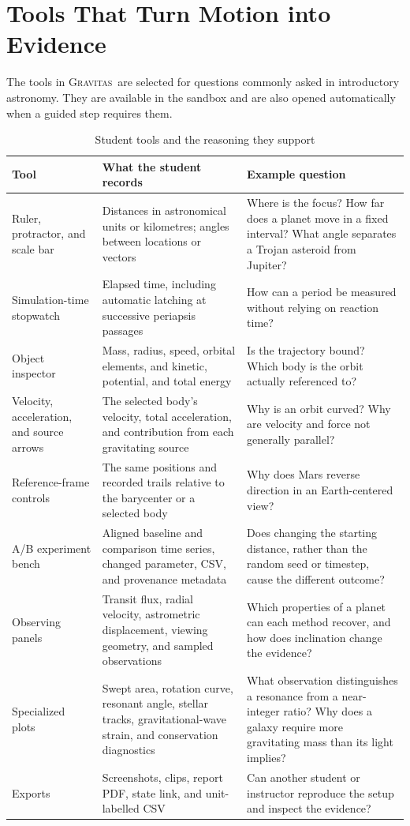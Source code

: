 \documentclass[twocolumn]{aastex631}
\newcommand{\Gravitas}{\textsc{Gravitas}}
\begin{document}
\section{Tools That Turn Motion into Evidence}
\label{sec:tools}

The tools in \Gravitas\ are selected for questions commonly asked in
introductory astronomy. They are available in the sandbox and are also opened
automatically when a guided step requires them.

\begin{table}[t]
\caption{Student tools and the reasoning they support}
\label{tab:tools}
\centering
\small
\renewcommand{\arraystretch}{1.12}
\begin{tabular}{p{}p{}p{}}
\hline\hline
\textbf{Tool} & \textbf{What the student records} & \textbf{Example question}\\
\hline
Ruler, protractor, and scale bar &
Distances in astronomical units or kilometres; angles between locations or
vectors &
Where is the focus? How far does a planet move in a fixed interval? What angle
separates a Trojan asteroid from Jupiter?\\
Simulation-time stopwatch &
Elapsed time, including automatic latching at successive periapsis passages &
How can a period be measured without relying on reaction time?\\
Object inspector &
Mass, radius, speed, orbital elements, and kinetic, potential, and total energy &
Is the trajectory bound? Which body is the orbit actually referenced to?\\
Velocity, acceleration, and source arrows &
The selected body's velocity, total acceleration, and contribution from each
gravitating source &
Why is an orbit curved? Why are velocity and force not generally parallel?\\
Reference-frame controls &
The same positions and recorded trails relative to the barycenter or a selected
body &
Why does Mars reverse direction in an Earth-centered view?\\
A/B experiment bench &
Aligned baseline and comparison time series, changed parameter, CSV, and
provenance metadata &
Does changing the starting distance, rather than the random seed or timestep,
cause the different outcome?\\
Observing panels &
Transit flux, radial velocity, astrometric displacement, viewing geometry, and
sampled observations &
Which properties of a planet can each method recover, and how does inclination
change the evidence?\\
Specialized plots &
Swept area, rotation curve, resonant angle, stellar tracks, gravitational-wave
strain, and conservation diagnostics &
What observation distinguishes a resonance from a near-integer ratio? Why does
a galaxy require more gravitating mass than its light implies?\\
Exports &
Screenshots, clips, report PDF, state link, and unit-labelled CSV &
Can another student or instructor reproduce the setup and inspect the evidence?\\
\hline
\end{tabular}
\end{table}
\end{document}

